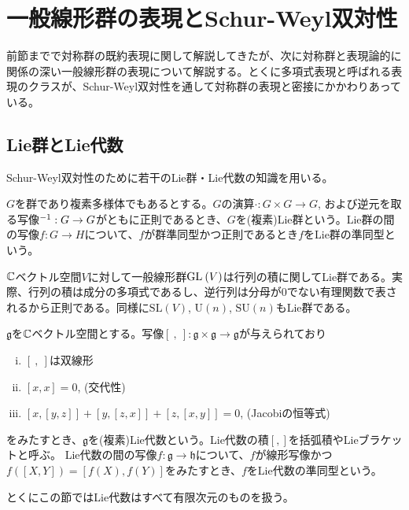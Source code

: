 \documentclass{ltjsreport}
\begin{document}
\section{一般線形群の表現とSchur-Weyl双対性}

前節までで対称群の既約表現に関して解説してきたが、次に対称群と表現論的に関係の深い一般線形群の表現について解説する。とくに多項式表現と呼ばれる表現のクラスが、Schur-Weyl双対性を通して対称群の表現と密接にかかわりあっている。



\subsection{Lie群とLie代数}\label{lie}
Schur-Weyl双対性のために若干のLie群・Lie代数の知識を用いる。

\begin{defin}[Lie群]
  $G$を群であり複素多様体でもあるとする。$G$の演算$\cdot:G\times G\rightarrow G$, および逆元を取る写像$^{-1}:G\rightarrow G$がともに正則であるとき、$G$を(複素)Lie群という。Lie群の間の写像$f:G\rightarrow H$について、$f$が群準同型かつ正則であるとき$f$をLie群の準同型という。
\end{defin}

\begin{eg}
  $\mathbb{C}$ベクトル空間$V$に対して一般線形群$\text{GL}\:(V)$は行列の積に関してLie群である。実際、行列の積は成分の多項式であるし、逆行列は分母が$0$でない有理関数で表されるから正則である。同様に$\text{SL}(V)$, $\text{U}(n)$, $\text{SU}(n)$もLie群である。
\end{eg}

\begin{defin}[Lie代数]
  $\mathfrak{g}$を$\mathbb{C}$ベクトル空間とする。写像$[\:,\:]:\mathfrak{g}\times \mathfrak{g}\rightarrow \mathfrak{g}$が与えられており
  \begin{enumerate}[(i)]
    \item $[\:,\:]$は双線形
    \item $[x,x]=0$, (交代性)
    \item $[x,[y,z]]+[y,[z,x]]+[z,[x,y]]=0$, (Jacobiの恒等式)
  \end{enumerate}
  をみたすとき、$\mathfrak{g}$を(複素)Lie代数という。Lie代数の積$[,]$を括弧積やLieブラケットと呼ぶ。
  Lie代数の間の写像$f:\mathfrak{g}\rightarrow \mathfrak{h}$について、$f$が線形写像かつ$f([X,Y])=[f(X),f(Y)]$をみたすとき、$f$をLie代数の準同型という。

  とくにこの節ではLie代数はすべて有限次元のものを扱う。
\end{defin}
\end{document}
